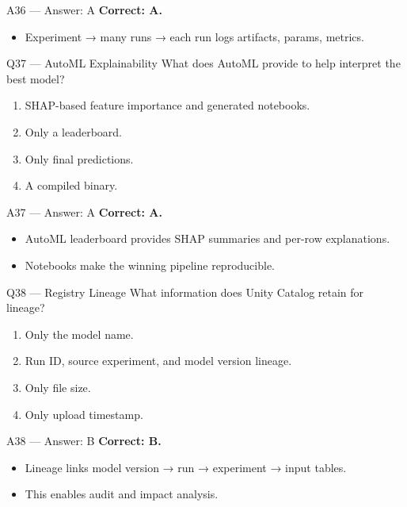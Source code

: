 \documentclass[aspectratio=169,10pt]{beamer}
\begin{document}
	\begin{frame}{A36 — Answer: A}
		\textbf{Correct: A.}
		\begin{itemize}
			\item Experiment → many runs → each run logs artifacts, params, metrics.
		\end{itemize}
	\end{frame}
	
	\begin{frame}{Q37 — AutoML Explainability}
		What does AutoML provide to help interpret the best model?
		\begin{enumerate}[label=\Alph*.]
			\item SHAP-based feature importance and generated notebooks.
			\item Only a leaderboard.
			\item Only final predictions.
			\item A compiled binary.
		\end{enumerate}
	\end{frame}
	
	\begin{frame}{A37 — Answer: A}
		\textbf{Correct: A.}
		\begin{itemize}
			\item AutoML leaderboard provides SHAP summaries and per-row explanations.
			\item Notebooks make the winning pipeline reproducible.
		\end{itemize}
	\end{frame}
	
	\begin{frame}{Q38 — Registry Lineage}
		What information does Unity Catalog retain for lineage?
		\begin{enumerate}[label=\Alph*.]
			\item Only the model name.
			\item Run ID, source experiment, and model version lineage.
			\item Only file size.
			\item Only upload timestamp.
		\end{enumerate}
	\end{frame}
	
	\begin{frame}{A38 — Answer: B}
		\textbf{Correct: B.}
		\begin{itemize}
			\item Lineage links model version → run → experiment → input tables.
			\item This enables audit and impact analysis.
		\end{itemize}
	\end{frame}
	
\end{document}
